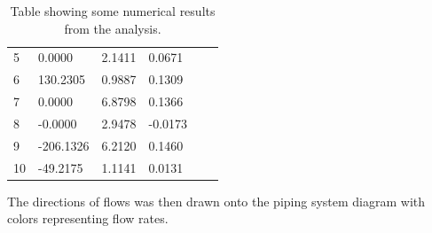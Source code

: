\documentclass{article}
\begin{document}
\begin{table}[]
\begin{tabular}{ll|l|lll}
\multicolumn{1}{l|}{5}  & 0.0000                                                                              & 2.1411                                                                                & \multicolumn{1}{l|}{0.0671}                                                         &  &  \\ \cline{2-4}
\multicolumn{1}{l|}{6}  & 130.2305                                                                            & 0.9887                                                                                & \multicolumn{1}{l|}{0.1309}                                                         &  &  \\ \cline{2-4}
\multicolumn{1}{l|}{7}  & 0.0000                                                                              & 6.8798                                                                                & \multicolumn{1}{l|}{0.1366}                                                         &  &  \\ \cline{2-4}
\multicolumn{1}{l|}{8}  & -0.0000                                                                             & 2.9478                                                                                & \multicolumn{1}{l|}{-0.0173}                                                        &  &  \\ \cline{2-4}
\multicolumn{1}{l|}{9}  & -206.1326                                                                           & 6.2120                                                                                & \multicolumn{1}{l|}{0.1460}                                                         &  &  \\ \cline{2-4}
\multicolumn{1}{l|}{10} & -49.2175                                                                            & 1.1141                                                                                & \multicolumn{1}{l|}{0.0131}                                                         &  &  \\ \cline{2-4}
\end{tabular}
\caption{Table showing some numerical results from the analysis.}
\label{hw1:table:1}
\end{table}

The directions of flows was then drawn onto the piping system diagram with colors representing flow rates.
\end{document}

